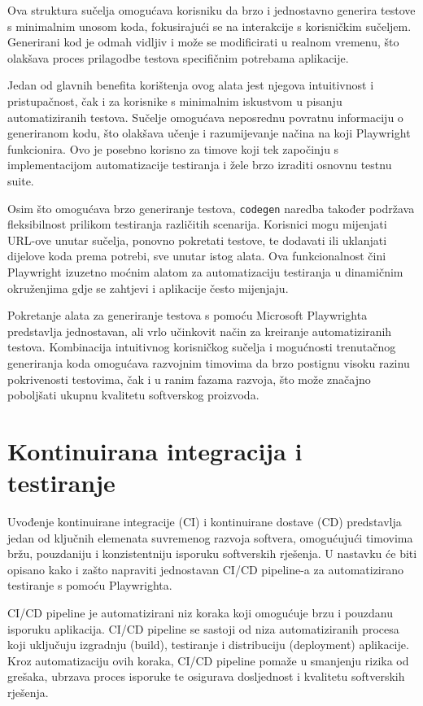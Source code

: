 Ova struktura sučelja omogućava korisniku da brzo i jednostavno generira testove s minimalnim unosom koda, fokusirajući se na interakcije s korisničkim sučeljem.
Generirani kod je odmah vidljiv i može se modificirati u realnom vremenu, što olakšava proces prilagodbe testova specifičnim potrebama aplikacije.

Jedan od glavnih benefita korištenja ovog alata jest njegova intuitivnost i pristupačnost, čak i za korisnike s minimalnim iskustvom u pisanju automatiziranih testova.
Sučelje omogućava neposrednu povratnu informaciju o generiranom kodu, što olakšava učenje i razumijevanje načina na koji Playwright funkcionira.
Ovo je posebno korisno za timove koji tek započinju s implementacijom automatizacije testiranja i žele brzo izraditi osnovnu testnu suite.

Osim što omogućava brzo generiranje testova, \texttt{codegen} naredba također podržava fleksibilnost prilikom testiranja različitih scenarija.
Korisnici mogu mijenjati URL-ove unutar sučelja, ponovno pokretati testove, te dodavati ili uklanjati dijelove koda prema potrebi, sve unutar istog alata.
Ova funkcionalnost čini Playwright izuzetno moćnim alatom za automatizaciju testiranja u dinamičnim okruženjima gdje se zahtjevi i aplikacije često mijenjaju.

Pokretanje alata za generiranje testova s pomoću Microsoft Playwrighta predstavlja jednostavan, ali vrlo učinkovit način za kreiranje automatiziranih testova.
Kombinacija intuitivnog korisničkog sučelja i mogućnosti trenutačnog generiranja koda omogućava razvojnim timovima da brzo postignu visoku razinu pokrivenosti testovima, čak i u ranim fazama razvoja, što može značajno poboljšati ukupnu kvalitetu softverskog proizvoda.

\section{Kontinuirana integracija i testiranje}\label{CI/CD}
Uvođenje kontinuirane integracije (CI) i kontinuirane dostave (CD) predstavlja jedan od ključnih elemenata suvremenog razvoja softvera, omogućujući timovima bržu, pouzdaniju i konzistentniju isporuku softverskih rješenja. 
U nastavku će biti opisano kako i zašto napraviti jednostavan CI/CD pipeline-a za automatizirano testiranje s pomoću Playwrighta.

CI/CD pipeline je automatizirani niz koraka koji omogućuje brzu i pouzdanu isporuku aplikacija. CI/CD pipeline se sastoji od niza automatiziranih procesa koji uključuju izgradnju (build), testiranje i distribuciju (deployment) aplikacije. 
Kroz automatizaciju ovih koraka, CI/CD pipeline pomaže u smanjenju rizika od grešaka, ubrzava proces isporuke te osigurava dosljednost i kvalitetu softverskih rješenja.

